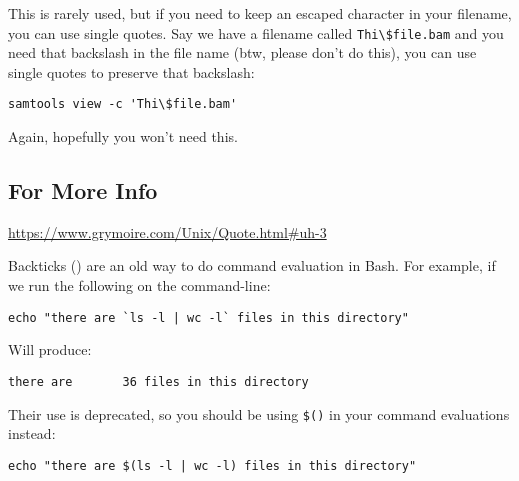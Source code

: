 \documentclass[
  letterpaper,
  DIV=11,
  numbers=noendperiod]{scrreprt}
\begin{document}
This is rarely used, but if you need to keep an escaped character in
your filename, you can use single quotes. Say we have a filename called
\texttt{Thi\textbackslash{}\$file.bam} and you need that backslash in
the file name (btw, please don't do this), you can use single quotes to
preserve that backslash:

\begin{verbatim}
samtools view -c 'Thi\$file.bam'
\end{verbatim}

Again, hopefully you won't need this.

\subsection{For More Info}\label{for-more-info}

\url{https://www.grymoire.com/Unix/Quote.html\#uh-3}

\begin{tcolorbox}[enhanced jigsaw, colbacktitle=quarto-callout-note-color!10!white, left=2mm, toprule=.15mm, toptitle=1mm, opacityback=0, bottomrule=.15mm, breakable, leftrule=.75mm, colframe=quarto-callout-note-color-frame, bottomtitle=1mm, titlerule=0mm, coltitle=black, title=\textcolor{quarto-callout-note-color}{\faInfo}\hspace{0.5em}{What about backticks?}, rightrule=.15mm, arc=.35mm, opacitybacktitle=0.6, colback=white]

Backticks (\texttt{\textasciigrave{}}) are an old way to do command
evaluation in Bash. For example, if we run the following on the
command-line:

\begin{verbatim}
echo "there are `ls -l | wc -l` files in this directory"
\end{verbatim}

Will produce:

\begin{verbatim}
there are       36 files in this directory
\end{verbatim}

Their use is deprecated, so you should be using \texttt{\$()} in your
command evaluations instead:

\begin{verbatim}
echo "there are $(ls -l | wc -l) files in this directory"
\end{verbatim}

\end{tcolorbox}
\end{document}
